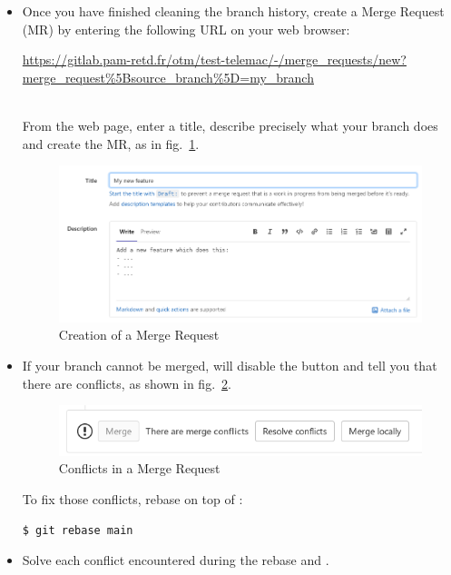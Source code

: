 \begin{itemize}
\item Once you have finished cleaning the branch history, create a Merge
Request (MR) by entering the following URL on your web browser:\\
\begin{small}
\url{https://gitlab.pam-retd.fr/otm/test-telemac/-/merge_requests/new?merge_request%5Bsource_branch%5D=my_branch}
\end{small}\\
From the web page, enter a title, describe precisely what your branch does and
create the MR, as in fig.~\ref{fig:mr-creation}.

\begin{figure}[H]
  \centering
  \includegraphics[scale=0.4]{graphics/mr_creation.png}
  \caption{Creation of a Merge Request}
  \label{fig:mr-creation}
\end{figure}

\item If your branch cannot be merged,  will disable the
 button and tell you that there are conflicts, as shown in
fig.~\ref{fig:mr-conflicts}.

\begin{figure}[H]
  \centering
  \includegraphics[scale=0.4]{graphics/mr_conflicts.png}
  \caption{Conflicts in a Merge Request}
  \label{fig:mr-conflicts}
\end{figure}

To fix those conflicts, rebase  on top of
:
\begin{lstlisting}
$ git rebase main
\end{lstlisting}

\item Solve each conflict  encountered during the rebase and
.


\end{itemize}
